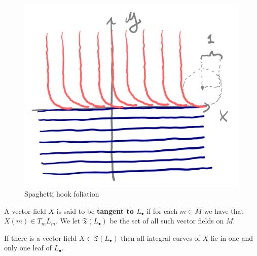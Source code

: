     \begin{figure}[H]
        \centering
        \includegraphics[width=0.7\linewidth]{spaghetti-hook.png}
        \caption{Spaghetti hook foliation}
        \label{spaghetti-hooks}
    \end{figure}

    \begin{definition}
        A vector field $X$ is said to be \textbf{tangent to $L_\bullet$} if for each $m \in M$ we have that $X(m) \in T_m L_m$. We let $\mathfrak{T}(L_\bullet)$ be the set of all such vector fields on $M$.
    \end{definition}

    \begin{prop}
	   If there is a vector field $X \in \mathfrak{T}(L_\bullet)$ then all integral curves of $X$ lie in one and only one leaf of $L_\bullet$.
    \end{prop}

